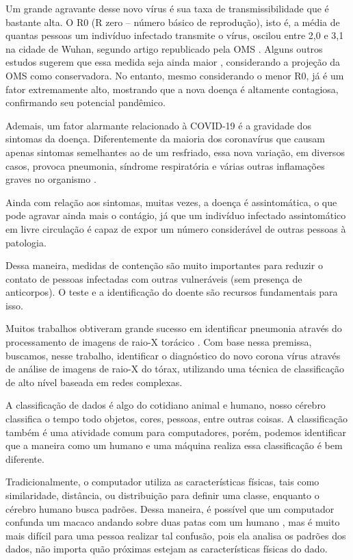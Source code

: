\documentclass[
12pt,        %
oneside,     %
a4paper,     %
english,       %
brazil        %
%
%
]{ppgca}
\begin{document}
Um grande agravante desse novo vírus é sua taxa de transmissibilidade que é bastante alta. O R0 (R zero – número básico de reprodução), isto é, a média de quantas pessoas um indivíduo infectado transmite o vírus, oscilou entre 2,0 e 3,1 na cidade de Wuhan, segundo artigo republicado pela OMS \cite{Majumder2020}. Alguns outros estudos sugerem que essa medida seja ainda maior \cite{ShiZhao2020, READ2020}, considerando a projeção da OMS como conservadora. No entanto, mesmo considerando o menor R0, já é um fator extremamente alto, mostrando que a nova doença é altamente contagiosa, confirmando seu potencial pandêmico. 


Ademais, um fator alarmante relacionado à COVID-19 é a gravidade dos sintomas da doença. Diferentemente da maioria dos coronavírus que causam apenas sintomas semelhantes ao de um resfriado, essa nova variação, em diversos casos, provoca pneumonia, síndrome respiratória e várias outras inflamações graves no organismo  \cite{HUANG2020}. 

Ainda com relação aos sintomas, muitas vezes, a doença é assintomática, o que pode agravar ainda mais o contágio, já que um indivíduo infectado assintomático em livre circulação é capaz de expor um número considerável de outras pessoas à patologia. 

Dessa maneira, medidas de contenção são muito importantes para reduzir o contato de pessoas infectadas com outras vulneráveis (sem presença de anticorpos). O teste e a identificação do doente são recursos fundamentais para isso. 

Muitos trabalhos obtiveram grande sucesso em identificar pneumonia através do processamento de imagens de raio-X torácico \cite{Sharma2017, Yee2020, HASHMI2020}. Com base nessa premissa, buscamos, nesse trabalho, identificar o diagnóstico do novo corona vírus através de análise de imagens de raio-X do tórax, utilizando uma técnica de classificação de alto nível baseada em redes complexas. 

A classificação de dados é algo do cotidiano animal e humano, nosso cérebro classifica o tempo todo objetos, cores, pessoas, entre outras coisas. A classificação também é uma atividade comum para computadores, porém, podemos identificar que a maneira como um humano e uma máquina realiza essa classificação é bem diferente. 

Tradicionalmente, o computador utiliza as características físicas, tais como similaridade, distância, ou distribuição para definir uma classe, enquanto o cérebro humano busca padrões. Dessa maneira, é possível que um computador confunda um macaco andando sobre duas patas com um humano \cite{guardian}, mas é muito mais difícil para uma pessoa realizar tal confusão, pois ela analisa os padrões dos dados, não importa quão próximas estejam as características físicas do dado. 
\end{document}
